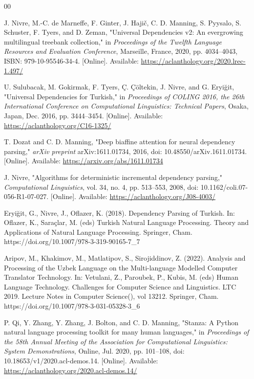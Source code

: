 \documentclass[10pt,conference,a4paper]{IEEEtran_EDM}
\begin{document}
\begin{thebibliography}{00}

 J. Nivre, M.-C. de Marneffe, F. Ginter, J. Hajič, C. D. Manning, S. Pyysalo, S. Schuster, F. Tyers, and D. Zeman, "Universal Dependencies v2: An evergrowing multilingual treebank collection," in \textit{Proceedings of the Twelfth Language Resources and Evaluation Conference}, Marseille, France, 2020, pp. 4034--4043, ISBN: 979-10-95546-34-4. [Online]. Available: \url{https://aclanthology.org/2020.lrec-1.497/}

U. Sulubacak, M. Gokirmak, F. Tyers, Ç. Çöltekin, J. Nivre, and G. Eryiğit, "Universal Dependencies for Turkish," in \textit{Proceedings of COLING 2016, the 26th International Conference on Computational Linguistics: Technical Papers}, Osaka, Japan, Dec. 2016, pp. 3444--3454. [Online]. Available: \url{https://aclanthology.org/C16-1325/}


T. Dozat and C. D. Manning, "Deep biaffine attention for neural dependency parsing," \textit{arXiv preprint} arXiv:1611.01734, 2016, doi: 10.48550/arXiv.1611.01734. [Online]. Available: \url{https://arxiv.org/abs/1611.01734}

J. Nivre, "Algorithms for deterministic incremental dependency parsing," \textit{Computational Linguistics}, vol. 34, no. 4, pp. 513--553, 2008, doi: 10.1162/coli.07-056-R1-07-027. [Online]. Available: \url{https://aclanthology.org/J08-4003/}

 Eryiğit, G., Nivre, J., Oflazer, K. (2018). Dependency Parsing of Turkish. In: Oflazer, K., Saraçlar, M. (eds) Turkish Natural Language Processing. Theory and Applications of Natural Language Processing. Springer, Cham. https://doi.org/10.1007/978-3-319-90165-7\_7

 Aripov, M., Khakimov, M., Matlatipov, S., Sirojiddinov, Z. (2022). Analysis and Processing of the Uzbek Language on the Multi-language Modelled Computer Translator Technology. In: Vetulani, Z., Paroubek, P., Kubis, M. (eds) Human Language Technology. Challenges for Computer Science and Linguistics. LTC 2019. Lecture Notes in Computer Science(), vol 13212. Springer, Cham. https://doi.org/10.1007/978-3-031-05328-3\_6

P. Qi, Y. Zhang, Y. Zhang, J. Bolton, and C. D. Manning, "Stanza: A Python natural language processing toolkit for many human languages," in \textit{Proceedings of the 58th Annual Meeting of the Association for Computational Linguistics: System Demonstrations}, Online, Jul. 2020, pp. 101--108, doi: 10.18653/v1/2020.acl-demos.14. [Online]. Available: \url{https://aclanthology.org/2020.acl-demos.14/}


\end{thebibliography}
\end{document}
